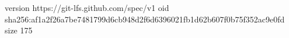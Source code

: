 version https://git-lfs.github.com/spec/v1
oid sha256:af1a2f26a7be7481799d6cb948d2f6d6396021fb1d62b607f0b75f352ac9e0fd
size 175
